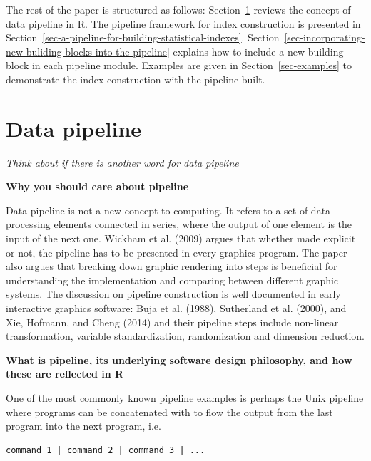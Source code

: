 \documentclass[
]{article}
\begin{document}
The rest of the paper is structured as follows:
Section~\ref{sec-data-pipeline-in-r} reviews the concept of data
pipeline in R. The pipeline framework for index construction is
presented in
Section~\ref{sec-a-pipeline-for-building-statistical-indexes}.
Section~\ref{sec-incorporating-new-buliding-blocks-into-the-pipeline}
explains how to include a new building block in each pipeline module.
Examples are given in Section~\ref{sec-examples} to demonstrate the
index construction with the pipeline built.

\hypertarget{sec-data-pipeline-in-r}{%
\section{Data pipeline}\label{sec-data-pipeline-in-r}}

\emph{Think about if there is another word for data pipeline}

\textbf{Why you should care about pipeline}

Data pipeline is not a new concept to computing. It refers to a set of
data processing elements connected in series, where the output of one
element is the input of the next one. Wickham et al. (2009) argues that
whether made explicit or not, the pipeline has to be presented in every
graphics program. The paper also argues that breaking down graphic
rendering into steps is beneficial for understanding the implementation
and comparing between different graphic systems. The discussion on
pipeline construction is well documented in early interactive graphics
software: Buja et al. (1988), Sutherland et al. (2000), and Xie,
Hofmann, and Cheng (2014) and their pipeline steps include non-linear
transformation, variable standardization, randomization and dimension
reduction.

\textbf{What is pipeline, its underlying software design philosophy, and
how these are reflected in R}

One of the most commonly known pipeline examples is perhaps the Unix
pipeline where programs can be concatenated with \texttt{\textbar{}} to
flow the output from the last program into the next program, i.e.~

\begin{verbatim}
command 1 | command 2 | command 3 | ...
\end{verbatim}
\end{document}
